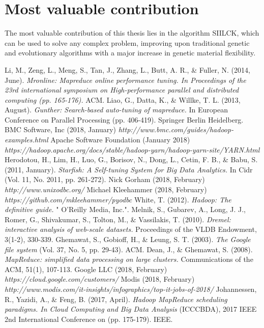 \documentclass[a4paper,english]{report}
\begin{document}
		\section{Most valuable contribution}
		The most valuable contribution of this thesis lies in the algorithm SIILCK, which can be used to solve any complex problem, improving upon traditional genetic and evolutionary algorithms with a major increase in genetic material flexibility.
	\begin{thebibliography}{1}
		Li, M., Zeng, L., Meng, S., Tan, J., Zhang, L., Butt, A. R., \& Fuller, N. (2014, June). \emph{Mronline: Mapreduce online performance tuning. In Proceedings of the 23rd international symposium on High-performance parallel and distributed computing (pp. 165-176).} ACM.
		Liao, G., Datta, K., \& Willke, T. L. (2013, August). \emph{Gunther: Search-based auto-tuning of mapreduce.} In European Conference on Parallel Processing (pp. 406-419). Springer Berlin Heidelberg.
		BMC Software, Inc (2018, January) \emph{http://www.bmc.com/guides/hadoop-examples.html}
		Apache Software Foundation (January 2018) \emph{https://hadoop.apache.org/docs/stable/hadoop-yarn/hadoop-yarn-site/YARN.html}
		Herodotou, H., Lim, H., Luo, G., Borisov, N., Dong, L., Cetin, F. B., \& Babu, S. (2011, January). \emph{Starfish: A Self-tuning System for Big Data Analytics.} In Cidr (Vol. 11, No. 2011, pp. 261-272).
		Nick Gorham (2018, February) \emph{http://www.unixodbc.org/}
		Michael Kleehammer (2018, February) \emph{https://github.com/mkleehammer/pyodbc}
		White, T. (2012). \emph{Hadoop: The definitive guide.} " O'Reilly Media, Inc.".
		Melnik, S., Gubarev, A., Long, J. J., Romer, G., Shivakumar, S., Tolton, M., \& Vassilakis, T. (2010). \emph{Dremel: interactive analysis of web-scale datasets.} Proceedings of the VLDB Endowment, 3(1-2), 330-339.
		Ghemawat, S., Gobioff, H., \& Leung, S. T. (2003). \emph{The Google file system} (Vol. 37, No. 5, pp. 29-43). ACM.
		Dean, J., \& Ghemawat, S. (2008). \emph{MapReduce: simplified data processing on large clusters.} Communications of the ACM, 51(1), 107-113.
		Google LLC (2018, February) \emph{https://cloud.google.com/customers/}
		Modis (2018, February) \emph{http://www.modis.com/it-insights/infographics/top-it-jobs-of-2018/}
		Johannessen, R., Yazidi, A., \& Feng, B. (2017, April). \emph{Hadoop MapReduce scheduling paradigms. In Cloud Computing and Big Data Analysis} (ICCCBDA), 2017 IEEE 2nd International Conference on (pp. 175-179). IEEE.

\end{thebibliography}
\end{document}
